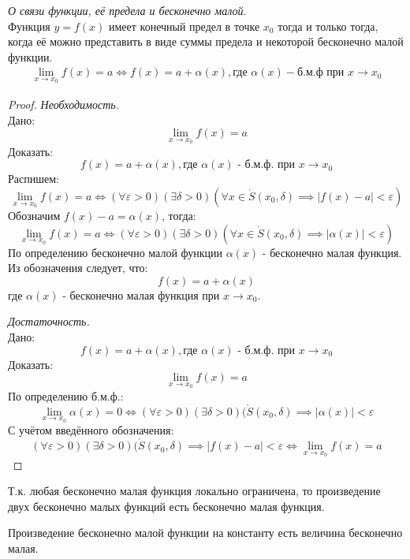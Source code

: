 \begin{theorem}
  \textit{О связи функции, её предела и бесконечно малой}. \\
  Функция $y = f(x)$ имеет конечный предел в точке  $x_0$ тогда и только тогда, когда её можно представить в виде суммы предела и некоторой бесконечно малой функции.
  \begin{gather*}
    \lim_{x \to x_0} f(x) = a \iff f(x) = a + \alpha(x), \text{где } \alpha(x) - \text{б.м.ф при } x \to x_0
  \end{gather*}
\end{theorem}
\begin{proof}
  \textit{Необходимость.} \\
  Дано: \[
    \lim_{x \to x_0} f(x) = a
  \]
  Доказать: \[
    f(x) = a + \alpha(x), \text{где } \alpha(x) \text{ - б.м.ф. при } x \to  x_0
  \]
  Распишем: \[
    \lim_{x \to x_0} f(x) = a \iff (\forall \varepsilon > 0)(\exists \delta > 0)(\forall x \in \mathring{S}(x_0, \delta) \implies |f(x) - a| < \varepsilon)  
  \]
  Обозначим $f(x) - a = \alpha(x)$, тогда: \[
    \lim_{x \to x_0} f(x) = a \iff (\forall \varepsilon > 0)(\exists \delta > 0)(\forall x \in \mathring{S}(x_0, \delta) \implies |\alpha(x)| < \varepsilon)  
  \]
  По определению бесконечно малой функции $\alpha(x)$ - бесконечно малая функция. Из обозначения следует, что: \[
    f(x) = a + \alpha(x)
  \]
  где $\alpha(x)$ - бесконечно малая функция при $x \to x_0$.

  \textit{Достаточность.} \\
  Дано: \[
    f(x) = a + \alpha(x), \text{где } \alpha(x) \text{ - б.м.ф. при } x \to x_0
  \]
  Доказать: \[
    \lim_{x \to x_0} f(x) = a
  \]
  По определению б.м.ф.: \[
    \lim_{x \to x_0} \alpha(x) = 0 \iff (\forall \varepsilon > 0)(\exists \delta > 0)(\mathring{S}(x_0, \delta) \implies |\alpha(x)| < \varepsilon 
  \]
  С учётом введённого обозначения: \[
    (\forall \varepsilon > 0)(\exists \delta > 0)(\mathring{S}(x_0, \delta) \implies |f(x) - a| < \varepsilon \iff \lim_{x \to x_0} f(x) = a
  \]
\end{proof}
\begin{corollary}
  Т.к. любая бесконечно малая функция локально ограничена, то произведение двух бесконечно малых функций есть бесконечно малая функция.
\end{corollary}
\begin{corollary}
  Произведение бесконечно малой функции на константу есть величина бесконечно малая.
\end{corollary}

